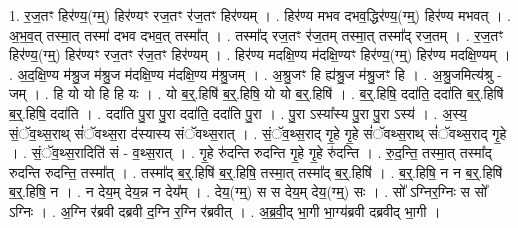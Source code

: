 \documentclass[17pt]{extarticle}
\begin{document}
1. र॒ज॒तꣳ हिर॑ण्य॒(ग्म्॒) हिर॑ण्यꣳ रज॒तꣳ र॑ज॒तꣳ हिर॑ण्यम् । . हिर॑ण्य मभव दभव॒द्धिर॑ण्य॒(ग्म्॒) हिर॑ण्य मभवत् । . अ॒भ॒व॒त् तस्मा॒त् तस्मा॑ दभव दभव॒त् तस्मा᳚त् । . तस्मा᳚द् रज॒तꣳ र॑ज॒तम् तस्मा॒त् तस्मा᳚द् रज॒तम् । . र॒ज॒तꣳ हिर॑ण्य॒(ग्म्॒) हिर॑ण्यꣳ रज॒तꣳ र॑ज॒तꣳ हिर॑ण्यम् । . हिर॑ण्य मदक्षि॒ण्य म॑दक्षि॒ण्यꣳ हिर॑ण्य॒(ग्म्॒) हिर॑ण्य मदक्षि॒ण्यम् । . अ॒द॒क्षि॒ण्य म॑श्रु॒ज म॑श्रु॒ज म॑दक्षि॒ण्य म॑दक्षि॒ण्य म॑श्रु॒जम् । . अ॒श्रु॒जꣳ हि ह्य॑श्रु॒ज म॑श्रु॒जꣳ हि । . अ॒श्रु॒जमित्य॑श्रु - जम् । . हि यो यो हि हि यः । . यो ब॒र्॒.हिषि॑ ब॒र्॒.हिषि॒ यो यो ब॒र्॒.हिषि॑ । . ब॒र्॒.हिषि॒ ददा॑ति॒ ददा॑ति ब॒र्॒.हिषि॑ ब॒र्॒.हिषि॒ ददा॑ति । . ददा॑ति पु॒रा पु॒रा ददा॑ति॒ ददा॑ति पु॒रा । . पु॒रा ऽस्या᳚स्य पु॒रा पु॒रा ऽस्य॑ । . अ॒स्य॒ सं॒ॅव॒थ्स॒राथ् सं॑ॅवथ्स॒रा द॑स्यास्य संॅवथ्स॒रात् । . सं॒ॅव॒थ्स॒राद् गृ॒हे गृ॒हे सं॑ॅवथ्स॒राथ् सं॑ॅवथ्स॒राद् गृ॒हे । . सं॒ॅव॒थ्स॒रादिति॑ सं - व॒थ्स॒रात् । . गृ॒हे रु॑दन्ति रुदन्ति गृ॒हे गृ॒हे रु॑दन्ति । . रु॒द॒न्ति॒ तस्मा॒त् तस्मा᳚द् रुदन्ति रुदन्ति॒ तस्मा᳚त् । . तस्मा᳚द् ब॒र्॒.हिषि॑ ब॒र्॒.हिषि॒ तस्मा॒त् तस्मा᳚द् ब॒र्॒.हिषि॑ । . ब॒र्॒.हिषि॒ न न ब॒र्॒.हिषि॑ ब॒र्॒.हिषि॒ न । . न देय॒म् देय॒न्न न देय᳚म् । . देय॒(ग्म्॒) स स देय॒म् देय॒(ग्म्॒) सः । . सो᳚ ऽग्निर॒ग्निः स सो᳚ ऽग्निः । . अ॒ग्नि र॑ब्रवी दब्रवी द॒ग्नि र॒ग्नि र॑ब्रवीत् । . अ॒ब्र॒वी॒द् भा॒गी भा॒ग्य॑ब्रवी दब्रवीद् भा॒गी । \newline
\end{document}
